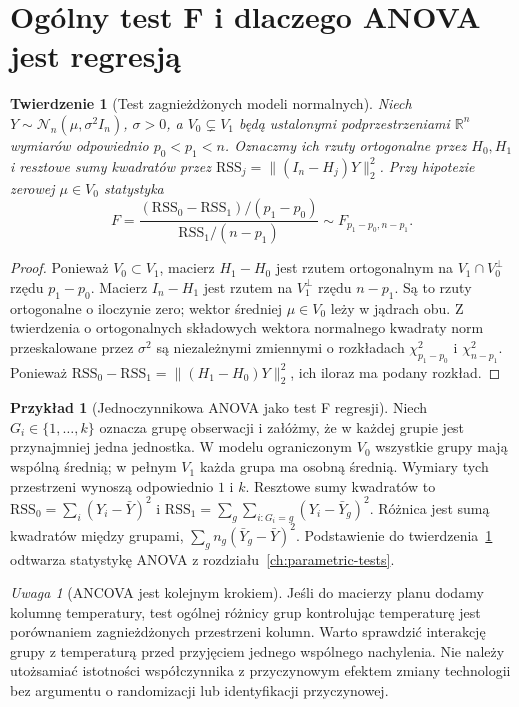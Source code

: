 \documentclass[11pt,a4paper,oneside]{report}
\numberwithin{equation}{chapter}
\theoremstyle{plain}
\newtheorem{twierdzenie}{Twierdzenie}[chapter]
\theoremstyle{definition}
\newtheorem{przyklad}{Przykład}[chapter]
\theoremstyle{remark}
\newtheorem{uwaga}{Uwaga}[chapter]
\newcommand{\R}{\mathbb R}
\begin{document}
\section{Ogólny test F i dlaczego ANOVA jest regresją}
\begin{twierdzenie}[Test zagnieżdżonych modeli normalnych]
\label{thm:partial-f-test}
Niech $Y\sim\mathcal N_n(\mu,\sigma^2I_n)$,
$\sigma>0$, a $V_0\subsetneq V_1$ będą ustalonymi
podprzestrzeniami $\R^n$ wymiarów odpowiednio
$p_0<p_1<n$. Oznaczmy ich rzuty ortogonalne przez
$H_0,H_1$ i resztowe sumy kwadratów przez
$\mathrm{RSS}_j=\|(I_n-H_j)Y\|_2^2$.
Przy hipotezie zerowej $\mu\in V_0$ statystyka
\[
 F=\frac{(\mathrm{RSS}_0-\mathrm{RSS}_1)/(p_1-p_0)}
 {\mathrm{RSS}_1/(n-p_1)}\sim F_{p_1-p_0,n-p_1}.
\]
\end{twierdzenie}
\begin{proof}
Ponieważ $V_0\subset V_1$, macierz $H_1-H_0$ jest
rzutem ortogonalnym na $V_1\cap V_0^\perp$ rzędu
$p_1-p_0$. Macierz $I_n-H_1$ jest rzutem na
$V_1^\perp$ rzędu $n-p_1$. Są to rzuty ortogonalne
o iloczynie zero; wektor średniej $\mu\in V_0$ leży
w jądrach obu. Z twierdzenia o ortogonalnych składowych
wektora normalnego kwadraty norm przeskalowane przez
$\sigma^2$ są niezależnymi zmiennymi o rozkładach
$\chi^2_{p_1-p_0}$ i $\chi^2_{n-p_1}$.
Ponieważ $\mathrm{RSS}_0-\mathrm{RSS}_1
=\|(H_1-H_0)Y\|_2^2$, ich iloraz ma podany rozkład.
\end{proof}

\begin{przyklad}[Jednoczynnikowa ANOVA jako test F regresji]
Niech $G_i\in\{1,\ldots,k\}$ oznacza grupę obserwacji
i załóżmy, że w każdej grupie jest przynajmniej jedna
jednostka. W modelu ograniczonym $V_0$ wszystkie grupy
mają wspólną średnią; w pełnym $V_1$ każda grupa ma
osobną średnią. Wymiary tych przestrzeni wynoszą
odpowiednio $1$ i $k$. Resztowe sumy kwadratów to
$\mathrm{RSS}_0=\sum_i(Y_i-\bar Y)^2$ i
$\mathrm{RSS}_1=\sum_g\sum_{i:G_i=g}(Y_i-\bar Y_g)^2$.
Różnica jest sumą kwadratów między grupami,
$\sum_gn_g(\bar Y_g-\bar Y)^2$.
Podstawienie do twierdzenia~\ref{thm:partial-f-test}
odtwarza statystykę ANOVA z rozdziału~\ref{ch:parametric-tests}.
\end{przyklad}

\begin{uwaga}[ANCOVA jest kolejnym krokiem]
Jeśli do macierzy planu dodamy kolumnę temperatury,
test ogólnej różnicy grup kontrolując temperaturę jest
porównaniem zagnieżdżonych przestrzeni kolumn. Warto
sprawdzić interakcję grupy z temperaturą przed przyjęciem
jednego wspólnego nachylenia. Nie należy utożsamiać
istotności współczynnika z przyczynowym efektem
zmiany technologii bez argumentu o randomizacji
lub identyfikacji przyczynowej.
\end{uwaga}
\end{document}
